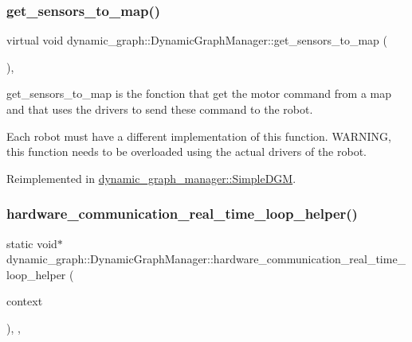 \subsubsection{\texorpdfstring{get\+\_\+sensors\+\_\+to\+\_\+map()}{get\_sensors\_to\_map()}}
{\footnotesize\ttfamily virtual void dynamic\+\_\+graph\+::\+Dynamic\+Graph\+Manager\+::get\+\_\+sensors\+\_\+to\+\_\+map (\begin{DoxyParamCaption}\item[{\hyperlink{namespacedynamic__graph_abd184187f3bc15df5e227d866529e4a7}{Vector\+D\+G\+Map} \&}]{ }\end{DoxyParamCaption})\hspace{0.3cm}{\ttfamily [inline]}, {\ttfamily [virtual]}}



get\+\_\+sensors\+\_\+to\+\_\+map is the fonction that get the motor command from a map and that uses the drivers to send these command to the robot. 

Each robot must have a different implementation of this function. W\+A\+R\+N\+I\+NG, this function needs to be overloaded using the actual drivers of the robot. 

Reimplemented in \hyperlink{classdynamic__graph__manager_1_1SimpleDGM_aa92cd33a31c934835252f834bab7b9f4}{dynamic\+\_\+graph\+\_\+manager\+::\+Simple\+D\+GM}.

\mbox{\label{classdynamic__graph_1_1DynamicGraphManager_a771ad93758759932899273c5f01975fc}} 
\subsubsection{\texorpdfstring{hardware\+\_\+communication\+\_\+real\+\_\+time\+\_\+loop\+\_\+helper()}{hardware\_communication\_real\_time\_loop\_helper()}}
{\footnotesize\ttfamily static void$\ast$ dynamic\+\_\+graph\+::\+Dynamic\+Graph\+Manager\+::hardware\+\_\+communication\+\_\+real\+\_\+time\+\_\+loop\+\_\+helper (\begin{DoxyParamCaption}\item[{void $\ast$}]{context }\end{DoxyParamCaption})\hspace{0.3cm}{\ttfamily [inline]}, {\ttfamily [static]}, {\ttfamily [private]}}



